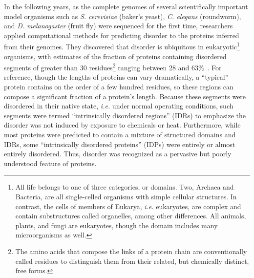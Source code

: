 In the following years, as the complete genomes of several scientifically important model organisms such as \textit{S. cerevisiae} (baker's yeast), \textit{C. elegans} (roundworm), and \textit{D. melanogaster} (fruit fly) were sequenced for the first time, researchers applied computational methods for predicting disorder to the proteins inferred from their genomes. They discovered that disorder is ubiquitous in eukaryotic\footnote{All life belongs to one of three categories, or domains. Two, Archaea and Bacteria, are all single-celled organisms with simple cellular structures. In contrast, the cells of members of Eukarya, \textit{i.e.} eukaryotes, are complex and contain substructures called organelles, among other differences. All animals, plants, and fungi are eukaryotes, though the domain includes many microorganisms as well.} organisms, with estimates of the fraction of proteins containing disordered segments of greater than 30 residues\footnote{The amino acids that compose the links of a protein chain are conventionally called residues to distinguish them from their related, but chemically distinct, free forms.} ranging between 28 and 63\%~\cite{Dunker2000, Ward2004}. For reference, though the lengths of proteins can vary dramatically, a ``typical'' protein contains on the order of a few hundred residues, so these regions can compose a significant fraction of a protein's length. Because these segments were disordered in their native state, \textit{i.e.} under normal operating conditions, such segments were termed ``intrinsically disordered regions'' (IDRs) to emphasize the disorder was not induced by exposure to chemicals or heat. Furthermore, while most proteins were predicted to contain a mixture of structured domains and IDRs, some ``intrinsically disordered proteins'' (IDPs) were entirely or almost entirely disordered. Thus, disorder was recognized as a pervasive but poorly understood feature of proteins.

